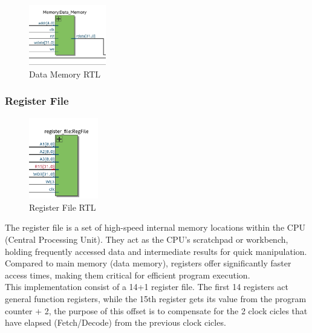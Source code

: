 \documentclass[9pt,a4paper,twoside]{tau}
\begin{document}
    \begin{figure}[h]  %
        \centering  %
        \includegraphics[width=0.3\textwidth]{images/DataMemImg.png}
        \caption{Data Memory RTL}
        \label{fig:Data Memory RTL}
    \end{figure}


\subsubsection{Register File}


\begin{figure}[h]  %
    \centering  %
    \includegraphics[width=0.27\textwidth]{images/RegFileImg.png}
    \caption{Register File RTL}
    \label{fig:Register File RTL}
\end{figure}


    The register file is a set of high-speed internal memory locations within the CPU (Central Processing Unit).  They act as the CPU's scratchpad or workbench, holding frequently accessed data and intermediate results for quick manipulation. Compared to main memory (data memory), registers offer significantly faster access times, making them critical for efficient program execution. \\
    This implementation consist of a 14+1 register file. The first 14 registers act general function registers, while the 15th register gets its value from the program counter + 2, the purpose of this offset is to compensate for the 2 clock cicles that have elapsed (Fetch/Decode) from the previous clock cicles.
\end{document}
